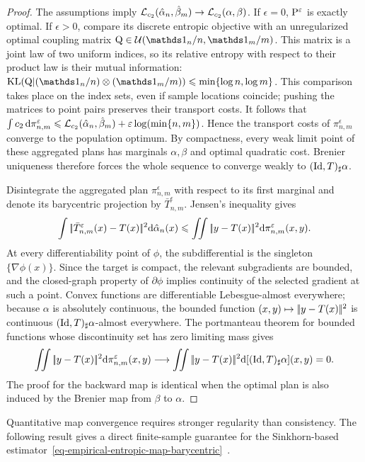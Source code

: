 \begin{proof}
	The assumptions imply \(\MK_{c_2}(\hat\alpha_n,\hat\beta_m)\to\MK_{c_2}(\alpha,\beta)\). If \(\epsilon=0\), \(\P^{\epsilon}\) is exactly optimal. If \(\epsilon>0\), compare its discrete entropic objective with an unregularized optimal coupling matrix $\Q\in\Couplings(\ones_n/n,\ones_m/m)$. This matrix is a joint law of two uniform indices, so its relative entropy with respect to their product law is their mutual information:
	$\KLD(\Q|(\ones_n/n)\otimes(\ones_m/m)) \leq \min\{\log n,\log m\}$.
	This comparison takes place on the index sets, even if sample locations coincide; pushing the matrices to point pairs preserves their transport costs.
		It follows that
		$\int c_2\,\d \pi_{n,m}^{\epsilon} \leq \MK_{c_2}(\hat\alpha_n,\hat\beta_m) +\epsilon\log(\min\{n,m\})$.
		Hence the transport costs of \(\pi_{n,m}^{\epsilon}\) converge to the population optimum. By compactness, every weak limit point of these aggregated plans has marginals \(\alpha,\beta\) and optimal quadratic cost. Brenier uniqueness therefore forces the whole sequence to converge weakly to \((\Id,T)_\sharp\alpha\).

		Disintegrate the aggregated plan \(\pi_{n,m}^{\epsilon}\) with respect to its first marginal and denote its barycentric projection by \(\bar T_{n,m}^{\epsilon}\). Jensen's inequality gives
	\[
		\int \norm{\bar T_{n,m}^{\epsilon}(x)-T(x)}^2\d\hat\alpha_n(x)
		\leq
			\iint \norm{y-T(x)}^2\d \pi_{n,m}^{\epsilon}(x,y).
	\]
	At every differentiability point of \(\phi\), the subdifferential is the singleton \(\{\nabla\phi(x)\}\). Since the target is compact, the relevant subgradients are bounded, and the closed-graph property of \(\partial\phi\) implies continuity of the selected gradient at such a point. Convex functions are differentiable Lebesgue-almost everywhere; because \(\alpha\) is absolutely continuous, the bounded function \((x,y)\mapsto\norm{y-T(x)}^2\) is continuous \((\Id,T)_\sharp\alpha\)-almost everywhere. The portmanteau theorem for bounded functions whose discontinuity set has zero limiting mass gives
	\[
			\iint \norm{y-T(x)}^2\d \pi_{n,m}^{\epsilon}(x,y)
		\longrightarrow
		\iint \norm{y-T(x)}^2\d[(\Id,T)_\sharp\alpha](x,y)=0.
	\]
	The proof for the backward map is identical when the optimal plan is also induced by the Brenier map from \(\beta\) to \(\alpha\).
\end{proof}

Quantitative map convergence requires stronger regularity than consistency. The following result gives a direct finite-sample guarantee for the Sinkhorn-based estimator~\eqref{eq-empirical-entropic-map-barycentric}~\cite{pooladian2021entropicOTMaps}.

